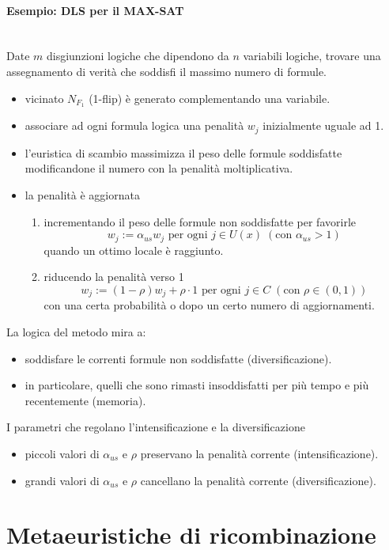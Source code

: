 \documentclass{article}
\begin{document}
\paragraph{Esempio: DLS per il MAX-SAT}\mbox{}\\
Date $m$ disgiunzioni logiche che dipendono da $n$ variabili logiche, trovare una assegnamento
di verità che soddisfi il massimo numero di formule.
\begin{itemize}
    \item vicinato $N_{F_1}$ (1-flip) è generato complementando una variabile.
    \item associare ad ogni formula logica una penalità $w_j$ inizialmente uguale ad 1.
    \item l'euristica di scambio massimizza il peso delle formule soddisfatte modificandone
    il numero con la penalità moltiplicativa.
    \item la penalità è aggiornata
    \begin{enumerate}
        \item incrementando il peso delle formule non soddisfatte per favorirle
        $$w_j:=\alpha_{us} w_j\text{ per ogni }j\in U(x)\;(\text{con }\alpha_{us}>1)$$
        quando un ottimo locale è raggiunto.

        \item riducendo la penalità verso 1
        $$w_j:=(1-\rho)w_j+\rho\cdot 1\text{ per ogni }j\in C \;(\text{con }\rho\in(0,1))$$
        con una certa probabilità o dopo un certo numero di aggiornamenti.
    \end{enumerate}
\end{itemize}
La logica del metodo mira a:
\begin{itemize}
    \item soddisfare le correnti formule non soddisfatte (diversificazione).
    \item in particolare, quelli che sono rimasti insoddisfatti per più tempo e
    più recentemente (memoria).
\end{itemize}
I parametri che regolano l'intensificazione e la diversificazione
\begin{itemize}
    \item piccoli valori di $\alpha_{us}$ e $\rho$ preservano la penalità corrente (intensificazione).
    \item grandi valori di $\alpha_{us}$ e $\rho$ cancellano la penalità corrente (diversificazione).
\end{itemize}


\section{Metaeuristiche di ricombinazione}
\end{document}
